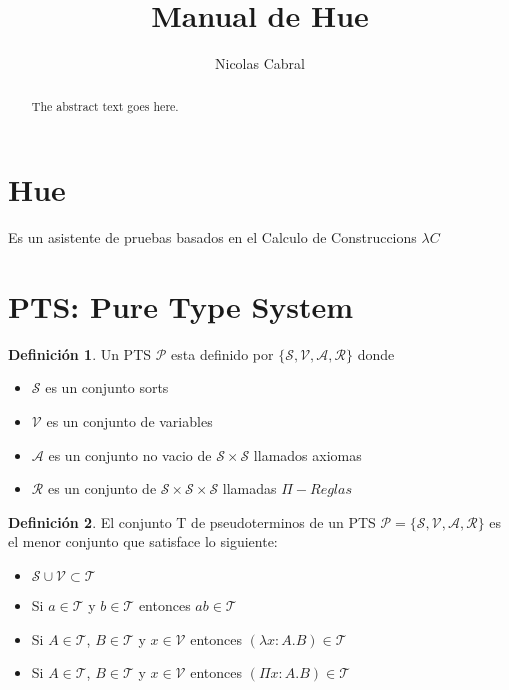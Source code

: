 \documentclass{article}
\theoremstyle{definition}
\newtheorem{definition}{Definición}[section]
\theoremstyle{remark}
\begin{document}
\title{Manual de Hue}
\author{Nicolas Cabral}

\maketitle

\begin{abstract}
The abstract text goes here.
\end{abstract}

\section{Hue}

  Es un asistente de pruebas basados en el Calculo de Construccions $\lambda C$


\section{PTS: Pure Type System}

\begin{definition}
Un PTS $\mathcal{P} $ esta definido por $\{ \mathcal{S}, \mathcal{V}, \mathcal{A}, \mathcal{R}\}$ donde

\begin{itemize}
    \item{$\mathcal{S}$} es un conjunto sorts
    \item{$\mathcal{V}$} es un conjunto de variables
    \item{$\mathcal{A}$} es un conjunto no vacio de $\mathcal{S}\times\mathcal{S}$ llamados axiomas 
    \item{$\mathcal{R}$} es un conjunto de $\mathcal{S}\times\mathcal{S}\times\mathcal{S}$ llamadas $\Pi-Reglas$ 
\end{itemize}
\end{definition}

\begin{definition}
El conjunto T de pseudoterminos de un PTS $ \mathcal{P} = \{ \mathcal{S}, \mathcal{V}, \mathcal{A}, \mathcal{R}\}$ 
es el menor conjunto que satisface lo siguiente:
\begin{itemize}
    \item{} $\mathcal{S} \cup \mathcal{V} \subset \mathcal{T}$
    \item{} Si $a \in \mathcal{T}$ y $b \in \mathcal{T}$ entonces $ab \in\mathcal{T}$
    \item{} Si $A \in \mathcal{T}$,  $B \in \mathcal{T}$  y $x \in \mathcal{V}$  entonces $(\lambda x:A.B) \in\mathcal{T}$
    \item{} Si $A \in \mathcal{T}$,  $B \in \mathcal{T}$  y $x \in \mathcal{V}$  entonces $(\Pi x:A.B) \in\mathcal{T}$
\end{itemize}

\end{definition}
\end{document}
